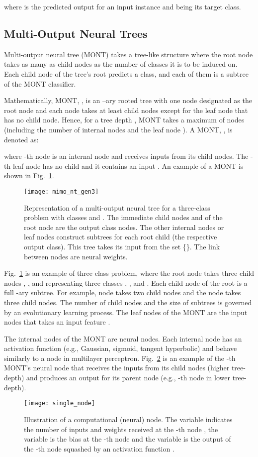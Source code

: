 \documentclass[conference]{IEEEtran}
\begin{document}
where  is the predicted output for an input instance  and  being its target class.
\subsection{Multi-Output Neural Trees}
\label{sec:nt}
Multi-output neural tree (MONT) takes a tree-like structure where the root node takes as many as child nodes as the number of classes it is to be induced on. Each child node of the tree's root predicts a class, and each of them is a subtree of the MONT classifier.

Mathematically, MONT, , is an --ary rooted tree with one node designated as the root node and each node takes at least  child nodes except for the leaf node that has no child node. Hence, for a tree depth , MONT takes a maximum of  nodes (including the number of internal nodes  and the leaf node ). A MONT, , is denoted as:

where -th node  is an internal node and receives  inputs from its child nodes. The -th leaf node  has no child and it contains an input . An example of a MONT is shown in Fig.~\ref{fig:mont}.  
\begin{figure}	
    \centerline{\texttt{[image: mimo\_nt\_gen3]}}
    \caption{Representation of a multi-output neural tree for a three-class problem with classes  and . The immediate child nodes  and  of the root node  are the output class nodes. The other internal nodes or leaf nodes construct subtrees for each root child (the respective output class). This tree takes its input from the set \{\}. The link  between nodes are neural weights.}
    \label{fig:mont}
\end{figure}

Fig.~\ref{fig:mont} is an example of three class problem, where the root node  takes three child nodes , , and  representing three classes , , and . Each child node of the root is a full -ary subtree. For example, node  takes two child nodes and the node   takes three child nodes. The number of child nodes and the size of subtrees is governed by an evolutionary learning process. The leaf nodes of the MONT are the input nodes that takes an input feature .

The internal nodes of the MONT are neural nodes. Each internal node has an activation function (e.g., Gaussian, sigmoid, tangent hyperbolic) and behave similarly to a node in multilayer perceptron. Fig.~\ref{fig:sing_node} is an example of the -th MONT's neural node that receives the inputs from its child nodes (higher tree-depth) and produces an output for its parent node (e.g., -th node in lower tree-depth).
\begin{figure}	
    \centerline{\texttt{[image: single\_node]}}
    \caption{ Illustration of a computational (neural) node. The variable  indicates the number of inputs  and weights  received at the -th node , the variable  is the bias at the -th node and the variable  is the output of the -th node squashed by an activation function .}
    \label{fig:sing_node}
\end{figure}
\end{document}
